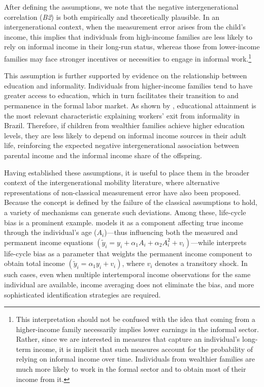 After defining the assumptions, we note that the negative intergenerational correlation (\emph{B2}) is both empirically and theoretically plausible. In an intergenerational context, when the measurement error arises from the child’s income, this implies that individuals from high-income families are less likely to rely on informal income in their long-run status, whereas those from lower-income families may face stronger incentives or necessities to engage in informal work.\footnote{This interpretation should not be confused with the idea that coming from a higher-income family necessarily implies lower earnings in the informal sector. Rather, since we are interested in measures that capture an individual’s long-term income, it is implicit that such measures account for the probability of relying on informal income over time. Individuals from wealthier families are much more likely to work in the formal sector and to obtain most of their income from it.} 

This assumption is further supported by evidence on the relationship between education and informality. Individuals from higher-income families tend to have greater access to education, which in turn facilitates their transition to and permanence in the formal labor market. As shown by \textcite{Romanello_2017}, educational attainment is the most relevant characteristic explaining workers’ exit from informality in Brazil. Therefore, if children from wealthier families achieve higher education levels, they are less likely to depend on informal income sources in their adult life, reinforcing the expected negative intergenerational association between parental income and the informal income share of the offspring.


Having established these assumptions, it is useful to place them in the broader context of the intergenerational mobility literature, where alternative representations of non-classical measurement error have also been proposed.  
Because the concept is defined by the failure of the classical assumptions to hold, a variety of mechanisms can generate such deviations.  
Among these, life-cycle bias is a prominent example. \textcite{Solon_1992} models it as a component affecting true income through the individual’s age ($A_i$)—thus influencing both the measured and permanent income equations $(\tilde{y}_i = y_i + \alpha_1 A_i + \alpha_2 A_i^2 + v_i)$—while \textcite{An_2022} interprets life-cycle bias as a parameter that weights the permanent income component to obtain total income $(\tilde{y}_i = \alpha_1 y_i + v_i)$, where $v_i$ denotes a transitory shock.  
In such cases, even when multiple intertemporal income observations for the same individual are available, income averaging does not eliminate the bias, and more sophisticated identification strategies are required.

